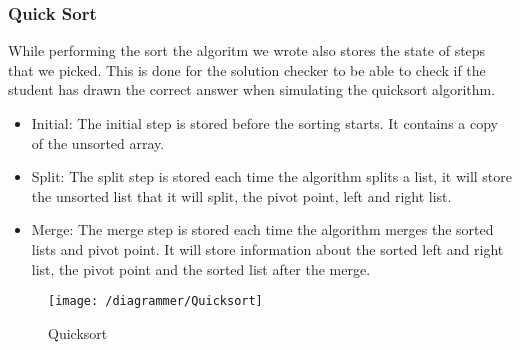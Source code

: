 \subsubsection{Quick Sort}
While performing the sort the algoritm we wrote also stores the state of steps that we picked. This is done for the solution checker to be able to check if the student has drawn the correct answer when simulating the quicksort algorithm.
\begin{itemize}
    \item Initial: The initial step is stored before the sorting starts. It contains a copy of the unsorted array.
    \item Split: The split step is stored each time the algorithm splits a list, it will store the unsorted list that it will split, the pivot point, left and right list.
    \item Merge: The merge step is stored each time the algorithm merges the sorted lists and pivot point. It will store information about the sorted left and right list, the pivot point and the sorted list after the merge.
\end{itemize}
\begin{figure}[H]
    \texttt{[image: /diagrammer/Quicksort]}
    \caption{Quicksort}
    \label{fig:quicksort}
\end{figure}